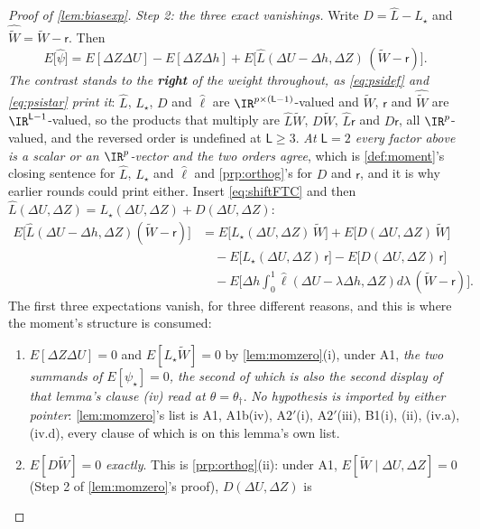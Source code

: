 \begin{proof}[Proof of \cref{lem:biasexp}]
\emph{Step 2: the three exact vanishings.} Write $D=\hat L-L_\star$ and
$\widehat{\widetilde W}=\widetilde W-\mathsf r$. Then
\[
E\big[\hat\psi\big]=E[\Delta Z\Delta U]-E[\Delta Z\Delta h]
+E\big[\hat L(\Delta U-\Delta h,\Delta Z)\,(\widetilde W-\mathsf r)\big].
\]
\emph{The contrast stands to the \textbf{right} of the weight throughout, as \eqref{eq:psidef} and
\eqref{eq:psistar} print it}: $\hat L$, $L_\star$, $D$ and $\hat\ell$ are
$\IR^{p\times(\mathsf L-1)}$-valued and $\widetilde W$, $\mathsf r$ and $\widehat{\widetilde W}$ are
$\IR^{\mathsf L-1}$-valued, so the products that multiply are $\hat L\widetilde W$, $D\widetilde W$,
$\hat L\mathsf r$ and $D\mathsf r$, all $\IR^{p}$-valued, and the reversed order is undefined at
$\mathsf L\ge3$. \emph{At $\mathsf L=2$ every factor above is a scalar or an $\IR^{p}$-vector and the two
orders agree}, which is \cref{def:moment}'s closing sentence for $\hat L$, $L_\star$ and $\hat\ell$ and
\cref{prp:orthog}'s for $D$ and $\mathsf r$, and it is why earlier rounds could print either.
Insert \eqref{eq:shiftFTC} and then $\hat L(\Delta U,\Delta Z)=L_\star(\Delta U,\Delta Z)+D(\Delta U,\Delta Z)$:
\begin{align*}
E\big[\hat L(\Delta U-\Delta h,\Delta Z)(\widetilde W-\mathsf r)\big]
&=E\big[L_\star(\Delta U,\Delta Z)\,\widetilde W\big]+E\big[D(\Delta U,\Delta Z)\,\widetilde W\big]\\
&\quad-E\big[L_\star(\Delta U,\Delta Z)\,\mathsf r\big]-E\big[D(\Delta U,\Delta Z)\,\mathsf r\big]\\
&\quad-E\Big[\Delta h\!\int_0^1\!\hat\ell(\Delta U-\lambda\Delta h,\Delta Z)d\lambda\,(\widetilde W-\mathsf r)\Big].
\end{align*}
The first three expectations vanish, for three different reasons, and this is where the moment's structure is
consumed:
\begin{enumerate}
\item[(a)] $E[\Delta Z\Delta U]=0$ and $E[L_\star\widetilde W]=0$ by \cref{lem:momzero}\textup{(i)}, under
A1, \emph{the two summands of $E[\psi_\star]=0$, the second of which is also the second display of that
lemma's clause \textup{(iv)} read at $\theta=\theta_\dagger$}. \emph{No hypothesis is imported by either
pointer}: \cref{lem:momzero}'s list is A1, A1b(iv), A$2'$(i), A$2'$(iii), B1(i), (ii), (iv.a), (iv.d), every clause
of which is on this lemma's own list.
\item[(b)] $E[D\widetilde W]=0$ \emph{exactly}. This is \cref{prp:orthog}(ii): under A1,
$E[\widetilde W\mid\Delta U,\Delta Z]=0$ (Step 2 of \cref{lem:momzero}'s proof), $D(\Delta U,\Delta Z)$ is

\end{enumerate}
\end{proof}
